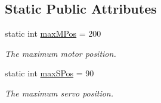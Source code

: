 \subsection*{Static Public Attributes}
\begin{DoxyCompactItemize}
\item 
static int \hyperlink{class_l_i_d_a_r___controller_1_1_measurement_ae4e112299a3c15095e6148bd06a47946}{max\+M\+Pos} = 200\hypertarget{class_l_i_d_a_r___controller_1_1_measurement_ae4e112299a3c15095e6148bd06a47946}{}\label{class_l_i_d_a_r___controller_1_1_measurement_ae4e112299a3c15095e6148bd06a47946}

\begin{DoxyCompactList}\small\item\em The maximum motor position. \end{DoxyCompactList}\item 
static int \hyperlink{class_l_i_d_a_r___controller_1_1_measurement_ad24203fe25dd2b9f232807e2953a2de2}{max\+S\+Pos} = 90\hypertarget{class_l_i_d_a_r___controller_1_1_measurement_ad24203fe25dd2b9f232807e2953a2de2}{}\label{class_l_i_d_a_r___controller_1_1_measurement_ad24203fe25dd2b9f232807e2953a2de2}

\begin{DoxyCompactList}\small\item\em The maximum servo position. \end{DoxyCompactList}\end{DoxyCompactItemize}
